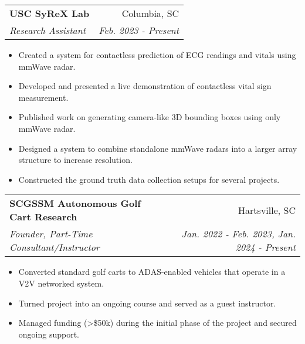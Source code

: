 \documentclass[letterpaper,11pt]{article}
\makeatletter
\newcommand{\resumeItem}[2]{
  \item\small{
    \textbf{#1}{: #2 \vspace{-2pt}}
  }
}
\newcommand{\resumeItemLine}[1]{
  \item\small{
    {#1 \vspace{-2pt}}
  }
}
\newcommand{\resumeSubheading}[4]{
  \vspace{-1pt}\item
    \begin{tabular*}{0.97\textwidth}{l@{\extracolsep{\fill}}r}
      \textbf{#1} & #2 \\
      \textit{\small#3} & \textit{\small #4} \\
    \end{tabular*}\vspace{-5pt}
}
\newcommand{\resumeItemListStart}{\begin{itemize}}
\newcommand{\resumeItemListEnd}{\end{itemize}\vspace{-5pt}}
\makeatother
\begin{document}
    \resumeSubheading
      {USC SyReX Lab}{Columbia, SC}
      {Research Assistant}{Feb. 2023 - Present}
      \resumeItemListStart
        \resumeItemLine{Created a system for contactless prediction of ECG readings and vitals using mmWave radar.}
        \resumeItemLine{Developed and presented a live demonstration of contactless vital sign measurement.}
        \resumeItemLine{Published work on generating camera-like 3D bounding boxes using only mmWave radar.} %
        \resumeItemLine{Designed a system to combine standalone mmWave radars into a larger array structure to increase resolution.}
        \resumeItemLine{Constructed the ground truth data collection setups for several projects.}

      \resumeItemListEnd


    \resumeSubheading
      {SCGSSM Autonomous Golf Cart Research}{Hartsville, SC}
      {Founder, Part-Time Consultant/Instructor}{Jan. 2022 - Feb. 2023, Jan. 2024 - Present}
      \resumeItemListStart
        \resumeItemLine{Converted standard golf carts to ADAS-enabled vehicles that operate in a V2V networked system.}
        \resumeItemLine{Turned project into an ongoing course and served as a guest instructor.}
        \resumeItemLine{Managed funding (>\$50k) during the initial phase of the project and secured ongoing support. }
      \resumeItemListEnd
  
\end{document}
